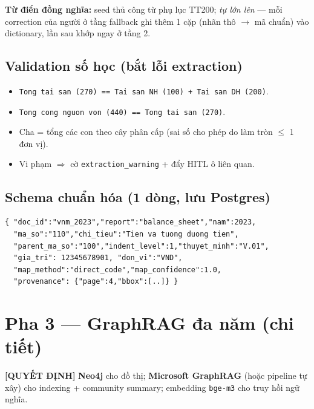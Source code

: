 \documentclass[11pt,a4paper]{article}
\newcommand{\dec}[1]{\textbf{\color{fsgreen!60!black}[QUYẾT ĐỊNH]} #1}
\begin{document}
\textbf{Từ điển đồng nghĩa:} seed thủ công từ phụ lục TT200; \emph{tự lớn lên} --- mỗi correction của người ở tầng fallback ghi thêm 1 cặp (nhãn thô $\rightarrow$ mã chuẩn) vào dictionary, lần sau khớp ngay ở tầng 2.

\subsection{Validation số học (bắt lỗi extraction)}
\label{sec:valid}
\begin{itemize}
  \item \texttt{Tong tai san (270) == Tai san NH (100) + Tai san DH (200)}.
  \item \texttt{Tong cong nguon von (440) == Tong tai san (270)}.
  \item Cha = tổng các con theo cây phân cấp (sai số cho phép do làm tròn $\leq$ 1 đơn vị).
  \item Vi phạm $\Rightarrow$ cờ \texttt{extraction\_warning} + đẩy HITL ô liên quan.
\end{itemize}

\subsection{Schema chuẩn hóa (1 dòng, lưu Postgres)}
\begin{Verbatim}
{ "doc_id":"vnm_2023","report":"balance_sheet","nam":2023,
  "ma_so":"110","chi_tieu":"Tien va tuong duong tien",
  "parent_ma_so":"100","indent_level":1,"thuyet_minh":"V.01",
  "gia_tri": 12345678901, "don_vi":"VND",
  "map_method":"direct_code","map_confidence":1.0,
  "provenance": {"page":4,"bbox":[..]} }
\end{Verbatim}

\section{Pha 3 --- GraphRAG đa năm (chi tiết)}

\begin{quyetdinh}
\dec{} \textbf{Neo4j} cho đồ thị; \textbf{Microsoft GraphRAG} (hoặc pipeline tự xây) cho indexing + community summary; embedding \texttt{bge-m3} cho truy hồi ngữ nghĩa.
\end{quyetdinh}
\end{document}
